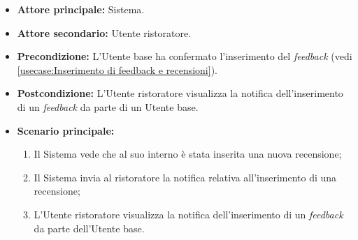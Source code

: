 \label{usecase:Visualizzazione notifica di inserimento feedback}
\begin{itemize}
	\item \textbf{Attore principale:} Sistema.

	\item \textbf{Attore secondario:} Utente ristoratore.

	\item \textbf{Precondizione:} L'Utente base ha confermato l'inserimento del \textit{feedback} (vedi \autoref{usecase:Inserimento di feedback e recensioni}).

	\item \textbf{Postcondizione:} L'Utente ristoratore visualizza la notifica
	      dell'inserimento di un \textit{feedback} da parte di un Utente base.

	\item \textbf{Scenario principale:}
	      \begin{enumerate}
		      \item Il Sistema vede che al suo interno è stata inserita una nuova recensione;
		      \item Il Sistema invia al ristoratore la notifica relativa all'inserimento di una recensione;
		      \item L'Utente ristoratore visualizza la notifica dell'inserimento
				  di un \textit{feedback} da parte dell'Utente base.
	      \end{enumerate}
\end{itemize}
